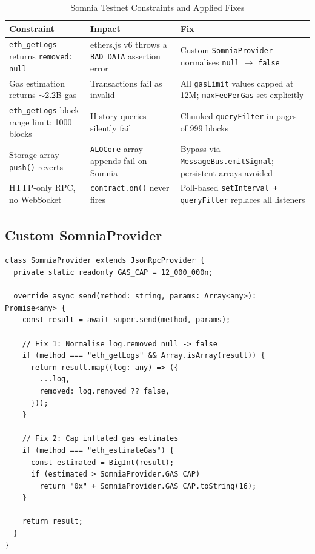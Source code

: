 \documentclass[11pt,a4paper]{article}
\begin{document}
\begin{table}[H]
\centering
\caption{Somnia Testnet Constraints and Applied Fixes}
\begin{tabular}{@{}p{4.2cm}p{4.2cm}p{4.2cm}@{}}
  \toprule
  \textbf{Constraint} & \textbf{Impact} & \textbf{Fix} \\
  \midrule
  \texttt{eth\_getLogs} returns \texttt{removed: null} &
    ethers.js v6 throws a \texttt{BAD\_DATA} assertion error &
    Custom \texttt{SomniaProvider} normalises \texttt{null} $\to$ \texttt{false} \\[6pt]

  Gas estimation returns $\sim$2.2B gas &
    Transactions fail as invalid &
    All \texttt{gasLimit} values capped at 12M; \texttt{maxFeePerGas} set explicitly \\[6pt]

  \texttt{eth\_getLogs} block range limit: 1000 blocks &
    History queries silently fail &
    Chunked \texttt{queryFilter} in pages of 999 blocks \\[6pt]

  Storage array \texttt{push()} reverts &
    \texttt{ALOCore} array appends fail on Somnia &
    Bypass via \texttt{MessageBus.emitSignal}; persistent arrays avoided \\[6pt]

  HTTP-only RPC, no WebSocket &
    \texttt{contract.on()} never fires &
    Poll-based \texttt{setInterval + queryFilter} replaces all listeners \\
  \bottomrule
\end{tabular}
\end{table}

\subsection{Custom SomniaProvider}

\begin{lstlisting}[caption=SomniaProvider with Two Quirk Fixes]
class SomniaProvider extends JsonRpcProvider {
  private static readonly GAS_CAP = 12_000_000n;

  override async send(method: string, params: Array<any>): Promise<any> {
    const result = await super.send(method, params);

    // Fix 1: Normalise log.removed null -> false
    if (method === "eth_getLogs" && Array.isArray(result)) {
      return result.map((log: any) => ({
        ...log,
        removed: log.removed ?? false,
      }));
    }

    // Fix 2: Cap inflated gas estimates
    if (method === "eth_estimateGas") {
      const estimated = BigInt(result);
      if (estimated > SomniaProvider.GAS_CAP)
        return "0x" + SomniaProvider.GAS_CAP.toString(16);
    }

    return result;
  }
}
\end{lstlisting}
\end{document}
